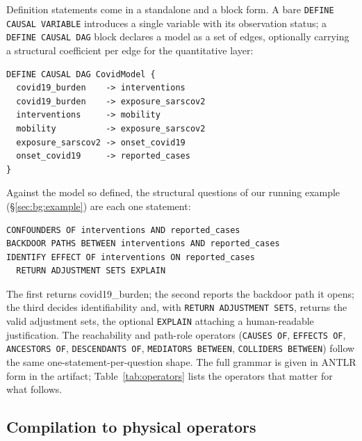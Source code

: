Definition statements come in a standalone and a block form. A bare
\lstinline[style=causaldsl]|DEFINE CAUSAL VARIABLE| introduces a single variable
with its observation status; a \lstinline[style=causaldsl]|DEFINE CAUSAL DAG|
block declares a model as a set of edges, optionally carrying a structural
coefficient per edge for the quantitative layer:

\begin{lstlisting}[style=causaldsl]
DEFINE CAUSAL DAG CovidModel {
  covid19_burden    -> interventions
  covid19_burden    -> exposure_sarscov2
  interventions     -> mobility
  mobility          -> exposure_sarscov2
  exposure_sarscov2 -> onset_covid19
  onset_covid19     -> reported_cases
}
\end{lstlisting}

\noindent
Against the model so defined, the structural questions of our running example
(\S\ref{sec:bg:example}) are each one statement:

\begin{lstlisting}[style=causaldsl]
CONFOUNDERS OF interventions AND reported_cases
BACKDOOR PATHS BETWEEN interventions AND reported_cases
IDENTIFY EFFECT OF interventions ON reported_cases
  RETURN ADJUSTMENT SETS EXPLAIN
\end{lstlisting}

\noindent
The first returns \textsf{covid19\_burden}; the second reports the backdoor path
it opens; the third decides identifiability and, with
\lstinline[style=causaldsl]|RETURN ADJUSTMENT SETS|, returns the valid adjustment
sets, the optional \lstinline[style=causaldsl]|EXPLAIN| attaching a
human-readable justification. The reachability and path-role operators
(\lstinline[style=causaldsl]|CAUSES OF|, \lstinline[style=causaldsl]|EFFECTS OF|,
\lstinline[style=causaldsl]|ANCESTORS OF|, \lstinline[style=causaldsl]|DESCENDANTS OF|,
\lstinline[style=causaldsl]|MEDIATORS BETWEEN|, \lstinline[style=causaldsl]|COLLIDERS BETWEEN|)
follow the same one-statement-per-question shape. The full grammar is given in
ANTLR form in the artifact; Table~\ref{tab:operators} lists the operators that
matter for what follows.

\subsection{Compilation to physical operators}\label{sec:lang:compile}

